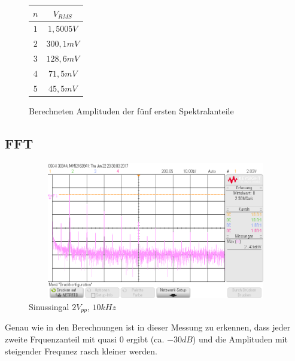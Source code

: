 \begin{figure}[H]
  \begin{center}
    \begin{tabular}{|c|c|} \hline
    $n$ & $V_{RMS}$ \\ \hline
    $1$ & $1,5005V$ \\ \hline
    $2$ & $300,1mV$ \\ \hline
    $3$ & $128,6mV$ \\ \hline
    $4$ & $71,5mV$ \\ \hline
    $5$ & $45,5mV$ \\ \hline
    \end{tabular}
  \end{center}
  \caption{Berechneten Amplituden der f\"unf ersten Spektralanteile} \label{bsp4_SpecCalc}
\end{figure}



\subsection{FFT}
\begin{figure}[H]
 \begin{center}
  \includegraphics[height=6cm,width=12cm]{OsziBilder/bsp4_sin_fft_10Vpp_dB.png}
 \end{center}
 \caption{Sinussingal $2V_{pp}$, $10kHz$}\label{bsp4_fft}
\end{figure}
\noindent
Genau wie in den Berechnungen ist in dieser Messung zu erkennen, dass jeder zweite Frquenzanteil mit quasi 0 ergibt (ca. $-30dB$) und die Amplituden mit steigender Frequnez rasch kleiner werden.

